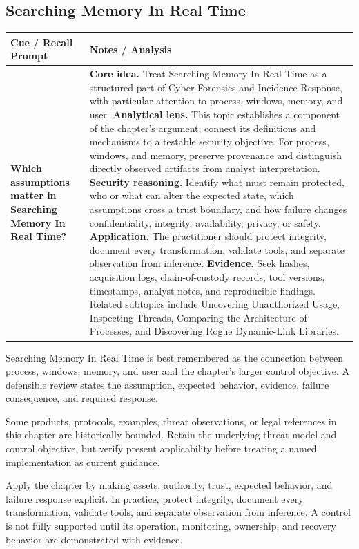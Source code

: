 \documentclass[11pt]{article}
\newcommand{\CornellHeader}{%
\rowcolor{Navy}\color{white}\bfseries Cue / Recall Prompt & \color{white}\bfseries Notes / Analysis\\\hline}
\newcommand{\CornellRow}[2]{%
\cellcolor{CueGray}\RaggedRight\textbf{#1} & \RaggedRight #2\\\hline}
\begin{document}
\subsection*{Searching Memory In Real Time}
\begin{longtable}{>{\RaggedRight\arraybackslash}p{}|>{\RaggedRight\arraybackslash}p{}}
\CornellHeader
\CornellRow{Which assumptions matter in Searching Memory In Real Time?}{\textbf{Core idea.} Treat Searching Memory In Real Time as a structured part of Cyber Forensics and Incidence Response, with particular attention to process, windows, memory, and user. \textbf{Analytical lens.} This topic establishes a component of the chapter's argument; connect its definitions and mechanisms to a testable security objective. For process, windows, and memory, preserve provenance and distinguish directly observed artifacts from analyst interpretation. \textbf{Security reasoning.} Identify what must remain protected, who or what can alter the expected state, which assumptions cross a trust boundary, and how failure changes confidentiality, integrity, availability, privacy, or safety. \textbf{Application.} The practitioner should protect integrity, document every transformation, validate tools, and separate observation from inference. \textbf{Evidence.} Seek hashes, acquisition logs, chain-of-custody records, tool versions, timestamps, analyst notes, and reproducible findings. Related subtopics include Uncovering Unauthorized Usage, Inspecting Threads, Comparing the Architecture of Processes, and Discovering Rogue Dynamic-Link Libraries.}
\end{longtable}
\begin{topicsummary}
Searching Memory In Real Time is best remembered as the connection between process, windows, memory, and user and the chapter's larger control objective. A defensible review states the assumption, expected behavior, evidence, failure consequence, and required response.
\end{topicsummary}
\begin{historybox}
Some products, protocols, examples, threat observations, or legal references in this chapter are historically bounded. Retain the underlying threat model and control objective, but verify present applicability before treating a named implementation as current guidance.
\end{historybox}
\begin{defensebox}
Apply the chapter by making assets, authority, trust, expected behavior, and failure response explicit. In practice, protect integrity, document every transformation, validate tools, and separate observation from inference. A control is not fully supported until its operation, monitoring, ownership, and recovery behavior are demonstrated with evidence.
\end{defensebox}
\end{document}

